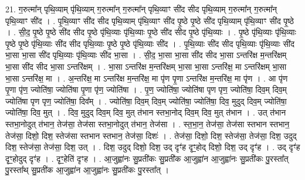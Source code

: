 \documentclass[17pt]{extarticle}
\begin{document}
21. ग॒रुत्मा᳚न् पृथि॒व्याम् पृ॑थि॒व्याम् ग॒रुत्मा᳚न् ग॒रुत्मा᳚न् पृथि॒व्याꣳ सी॑द सीद पृथि॒व्याम् ग॒रुत्मा᳚न् ग॒रुत्मा᳚न् पृथि॒व्याꣳ सी॑द । . पृ॒थि॒व्याꣳ सी॑द सीद पृथि॒व्याम् पृ॑थि॒व्याꣳ सी॑द पृ॒ष्ठे पृ॒ष्ठे सी॑द पृथि॒व्याम् पृ॑थि॒व्याꣳ सी॑द पृ॒ष्ठे । . सी॒द॒ पृ॒ष्ठे पृ॒ष्ठे सी॑द सीद पृ॒ष्ठे पृ॑थि॒व्याः पृ॑थि॒व्याः पृ॒ष्ठे सी॑द सीद पृ॒ष्ठे पृ॑थि॒व्याः । . पृ॒ष्ठे पृ॑थि॒व्याः पृ॑थि॒व्याः पृ॒ष्ठे पृ॒ष्ठे पृ॑थि॒व्याः सी॑द सीद पृथि॒व्याः पृ॒ष्ठे पृ॒ष्ठे पृ॑थि॒व्याः सी॑द । . पृ॒थि॒व्याः सी॑द सीद पृथि॒व्याः पृ॑थि॒व्याः सी॑द भा॒सा भा॒सा सी॑द पृथि॒व्याः पृ॑थि॒व्याः सी॑द भा॒सा । . सी॒द॒ भा॒सा भा॒सा सी॑द सीद भा॒सा ऽन्तरि॑क्ष म॒न्तरि॑क्षम् भा॒सा सी॑द सीद भा॒सा ऽन्तरि॑क्षम् । . भा॒सा ऽन्तरि॑क्ष म॒न्तरि॑क्षम् भा॒सा भा॒सा ऽन्तरि॑क्ष॒ मा ऽन्तरि॑क्षम् भा॒सा भा॒सा ऽन्तरि॑क्ष॒ मा । . अ॒न्तरि॑क्ष॒ मा ऽन्तरि॑क्ष म॒न्तरि॑क्ष॒ मा पृ॑ण पृ॒णा ऽन्तरि॑क्ष म॒न्तरि॑क्ष॒ मा पृ॑ण । . आ पृ॑ण पृ॒णा पृ॑ण॒ ज्योति॑षा॒ ज्योति॑षा पृ॒णा पृ॑ण॒ ज्योति॑षा । . पृ॒ण॒ ज्योति॑षा॒ ज्योति॑षा पृण पृण॒ ज्योति॑षा॒ दिव॒म् दिव॒म् ज्योति॑षा पृण पृण॒ ज्योति॑षा॒ दिव᳚म् । . ज्योति॑षा॒ दिव॒म् दिव॒म् ज्योति॑षा॒ ज्योति॑षा॒ दिव॒ मुदुद् दिव॒म् ज्योति॑षा॒ ज्योति॑षा॒ दिव॒ मुत् । . दिव॒ मुदुद् दिव॒म् दिव॒ मुत् त॑भान स्तभा॒नोद् दिव॒म् दिव॒ मुत् त॑भान । . उत् त॑भान स्तभा॒नोदुत् त॑भान॒ तेज॑सा॒ तेज॑सा स्तभा॒नोदुत् त॑भान॒ तेज॑सा । . स्त॒भा॒न॒ तेज॑सा॒ तेज॑सा स्तभान स्तभान॒ तेज॑सा॒ दिशो॒ दिश॒ स्तेज॑सा स्तभान स्तभान॒ तेज॑सा॒ दिशः॑ । . तेज॑सा॒ दिशो॒ दिश॒ स्तेज॑सा॒ तेज॑सा॒ दिश॒ उदुद् दिश॒ स्तेज॑सा॒ तेज॑सा॒ दिश॒ उत् । . दिश॒ उदुद् दिशो॒ दिश॒ उद् दृꣳ॑ह दृꣳ॒॒होद् दिशो॒ दिश॒ उद् दृꣳ॑ह । . उद् दृꣳ॑ह दृꣳ॒॒होदुद् दृꣳ॑ह । . दृꣳ॒॒हेति॑ दृꣳह । . आ॒जुह्वा॑नः सु॒प्रती॑कः सु॒प्रती॑क आ॒जुह्वा॑न आ॒जुह्वा॑नः सु॒प्रती॑कः पु॒रस्ता᳚त् पु॒रस्ता᳚थ् सु॒प्रती॑क आ॒जुह्वा॑न आ॒जुह्वा॑नः सु॒प्रती॑कः पु॒रस्ता᳚त् । \newline
\end{document}
